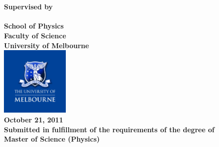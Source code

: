 
\begin{center}
\vspace{2.0cm}
\Huge
\bfseries
\text{\bfseries{\mytitle}}\\

\mdseries
\vspace{2.0cm}
\Large{\myname}\\
\vspace{1.0cm} %
\large{
Supervised by\\
\supervisor{}\\}
\vspace{4.0cm}
\Large{School of Physics}\\
\large{Faculty of Science}\\
\large{University of Melbourne\\}
\vspace{0.5cm}
\includegraphics[width = 0.25\textwidth]{logo.pdf}\\

\vspace{2.0cm}
\Large{October 21, 2011\\}
\vspace{0.5cm}
\normalsize
Submitted in fulfillment of the requirements of the degree of\\
Master of Science (Physics)
\end{center}